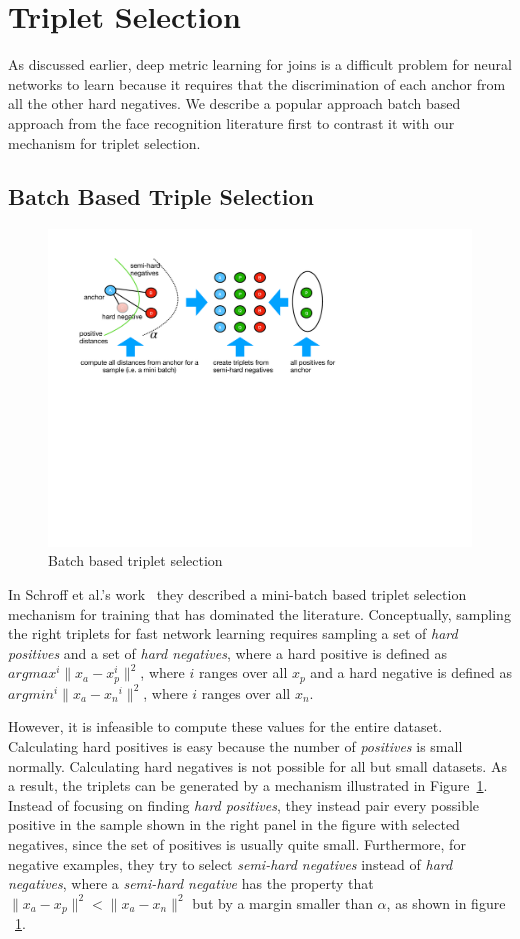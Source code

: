 \section{Triplet Selection}
As discussed earlier, deep metric learning for joins is a difficult problem for neural networks to learn because it requires that the discrimination of each anchor from all the other hard negatives.  We describe a popular approach batch based approach from the face recognition literature first to contrast it with our mechanism for triplet selection.

\subsection{Batch Based Triple Selection}
\begin{figure}
\includegraphics[width=0.8\linewidth]{triplet_selection}
\caption{Batch based triplet selection}
\label{triplet_selection}
\end{figure}

In Schroff et al.'s work~\cite{DBLP:conf/cvpr/SchroffKP15} they described a mini-batch based triplet selection mechanism for training that has dominated the literature.  Conceptually, sampling the right triplets for fast network learning requires sampling a set of \textit{hard positives} and a set of \textit{hard negatives}, where a hard positive is defined as $argmax^i \| x_{a} - x_{p}^i \|^2$, where $i$ ranges over all $x_p$ and a hard negative is defined as $argmin^i \| x_{a} - x{_n}^i \|^2$, where $i$ ranges over all $x_n$. 

However, it is infeasible to compute these values for the entire dataset.  Calculating hard positives is easy because the number of \textit{positives} is small normally.  Calculating hard negatives is not possible for all but small datasets.  As a result, the triplets can be generated by a mechanism illustrated in Figure~\ref{triplet_selection}.  Instead of focusing on finding \textit{hard positives}, they instead pair every possible positive in the sample shown in the right panel in the figure with selected negatives, since the set of positives is usually quite small.  Furthermore, for negative examples, they try to select \textit{semi-hard negatives} instead of \textit{hard negatives}, where a \textit{semi-hard negative} has the property that $\|x_a - x_p \|^2 < \|x_a - x_n \|^2$ but by a margin smaller than $\alpha$, as shown in figure ~\ref{triplet_selection}.  

